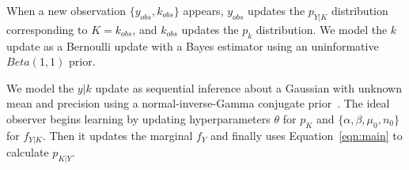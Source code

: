 \documentclass[10pt,letterpaper]{article}
\begin{document}
When a new observation $\{y_{obs}, k_{obs}\}$ appears, $y_{obs}$ updates the $p_{Y|K}$ distribution corresponding to $K = k_{obs}$, and $k_{obs}$ updates the $p_k$ distribution. We model the $k$ update as a Bernoulli update with a Bayes estimator using an uninformative $Beta(1,1)$ prior. 



We model the $y|k$ update as sequential inference about a Gaussian with unknown mean and precision using a normal-inverse-Gamma conjugate prior~\cite{murphy2007conjugate}. The ideal observer begins learning by updating hyperparameters $\theta$ for $p_K$ and $\{\alpha, \beta, \mu_0, n_0\}$ for $f_{Y|K}$. Then it updates the marginal $f_Y$ and finally uses Equation~\ref{eqn:main} to calculate $p_{K|Y}$. 



\end{document}

